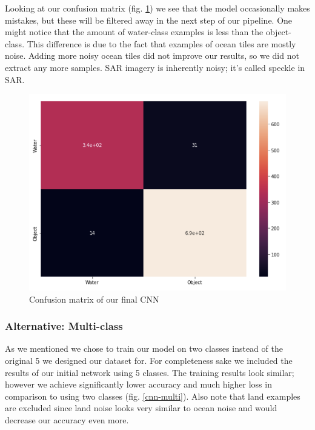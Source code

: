 Looking at our confusion matrix (fig. \ref{bin-confusion}) we see that the model occasionally makes mistakes, but these will be filtered away in the next step of our pipeline. One might notice that the amount of water-class examples is less than the object-class. This difference is due to the fact that examples of ocean tiles are mostly noise. Adding more noisy ocean tiles did not improve our results, so we did not extract any more samples. SAR imagery is inherently noisy; it's called speckle in SAR.

\begin{figure}[ht]
\begin{center}
\centerline{\includegraphics[width=\columnwidth]{images/bin-confusion.png}}
\caption{Confusion matrix of our final CNN}
\label{bin-confusion}
\end{center}
\end{figure}

\subsubsection{Alternative: Multi-class}

As we mentioned we chose to train our model on two classes instead of the original 5 we designed our dataset for. For completeness sake we included the results of our initial network using 5 classes. The training results look similar; however we achieve significantly lower accuracy and much higher loss in comparison to using two classes (fig. \ref{cnn-multi}). Also note that land examples are excluded since land noise looks very similar to ocean noise and would decrease our accuracy even more.

